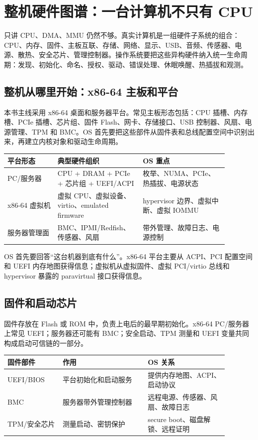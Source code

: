 \section{整机硬件图谱：一台计算机不只有 CPU}

只讲 CPU、DMA、MMU 仍然不够。真实计算机是一组硬件子系统的组合：CPU、内存、固件、主板互联、存储、网络、显示、USB、音频、传感器、电源、散热、安全芯片、管理控制器。操作系统要把这些异构硬件纳入统一生命周期：发现、初始化、命名、授权、驱动、错误处理、休眠唤醒、热插拔和观测。

\subsection{整机从哪里开始：x86-64 主板和平台}

本书主线采用 x86-64 桌面和服务器平台。常见主板形态包括：CPU 插槽、内存槽、PCIe 插槽、芯片组、固件 Flash、网卡、存储接口、USB 控制器、风扇、电源管理、TPM 和 BMC。OS 首先要把这些部件从固件表和总线配置空间中识别出来，再建立内核对象和驱动生命周期。

\begin{longtable}{p{0.2\linewidth}p{0.34\linewidth}p{0.34\linewidth}}
\toprule
平台形态 & 典型硬件组织 & OS 重点 \\
\midrule
PC/服务器 & CPU + DRAM + PCIe + 芯片组 + UEFI/ACPI & 枚举、NUMA、PCIe、热插拔、电源状态 \\
x86-64 虚拟机 & 虚拟 CPU、虚拟设备、virtio、emulated firmware & hypervisor 边界、虚拟中断、虚拟 IOMMU \\
服务器管理面 & BMC、IPMI/Redfish、传感器、风扇 & 带外管理、故障日志、电源控制 \\
\bottomrule
\end{longtable}

OS 首先要回答“这台机器到底有什么”。x86-64 平台主要从 ACPI、PCI 配置空间和 UEFI 内存地图获得信息；虚拟机从虚拟固件、虚拟 PCI/virtio 总线和 hypervisor 暴露的 paravirtual 接口获得信息。

\subsection{固件和启动芯片}

固件存放在 Flash 或 ROM 中，负责上电后的最早期初始化。x86-64 PC/服务器上常见 UEFI；服务器还可能有 BMC；安全启动、TPM 测量和 UEFI 变量共同构成启动可信链的一部分。

\begin{longtable}{p{0.22\linewidth}p{0.34\linewidth}p{0.32\linewidth}}
\toprule
固件部件 & 作用 & OS 关系 \\
\midrule
UEFI/BIOS & 平台初始化和启动服务 & 提供内存地图、ACPI、启动协议 \\
BMC & 服务器带外管理控制器 & 远程电源、传感器、风扇、故障日志 \\
TPM/安全芯片 & 测量启动、密钥保护 & secure boot、磁盘解锁、远程证明 \\
\bottomrule
\end{longtable}

